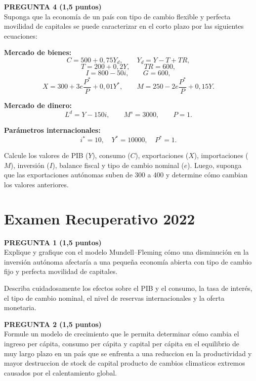 \documentclass[11pt,addpoints]{article}
\begin{document}
\vspace{0.4cm}

\textbf{PREGUNTA 4 (1,5 puntos)}\\[0.2cm]
Suponga que la economía de un país con tipo de cambio flexible y perfecta movilidad de capitales se puede caracterizar en el corto plazo por las siguientes ecuaciones:

\medskip
\textbf{Mercado de bienes:}
\[
C = 500 + 0{,}75Y_d, \qquad Y_d = Y - T + TR,
\]
\[
T = 200 + 0{,}2Y, \qquad TR = 600,
\]
\[
I = 800 - 50i, \qquad G = 600,
\]
\[
X = 300 + 3e\frac{P^*}{P} + 0{,}01Y^*, \qquad
M = 250 - 2e\frac{P^*}{P} + 0{,}15Y.
\]

\textbf{Mercado de dinero:}
\[
L^d = Y - 150i, \qquad M^s = 3000, \qquad P = 1.
\]

\newpage
\vspace*{0.5cm}

\textbf{Parámetros internacionales:}
\[
i^* = 10, \quad Y^* = 10000, \quad P^* = 1.
\]

\medskip
Calcule los valores de PIB ($Y$), consumo ($C$), exportaciones ($X$), importaciones ($M$), inversión ($I$), balance fiscal y tipo de cambio nominal ($e$). Luego, suponga que las exportaciones autónomas suben de 300 a 400 y determine cómo cambian los valores anteriores.


\section*{Examen Recuperativo 2022}


\textbf{PREGUNTA 1 (1,5 puntos)}\\[0.2cm]
Explique y grafique con el modelo Mundell–Fleming cómo una disminución en la inversión autónoma afectaría a una pequeña economía abierta con tipo de cambio fijo y perfecta movilidad de capitales.  

Describa cuidadosamente los efectos sobre el PIB y el consumo, la tasa de interés, el tipo de cambio nominal, el nivel de reservas internacionales y la oferta monetaria.

\vspace{0.4cm}

\textbf{PREGUNTA 2 (1,5 puntos)}\\[0.2cm]
Formule un modelo de crecimiento que le permita determinar cómo cambia el ingreso per cápita, consumo per cápita y capital per cápita en el equilibrio de muy largo plazo en un país que se enfrenta a una reduccion en la productividad y mayor destruccion de stock de capital producto de cambios climaticos extremos causados por el calentamiento global.
\end{document}
